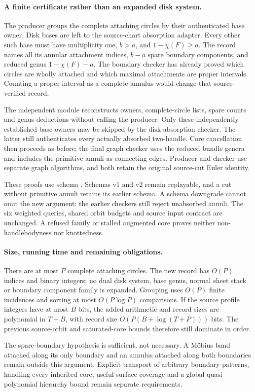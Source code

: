 \paragraph{A finite certificate rather than an expanded disk system.}
The producer groups the complete attaching circles by their authenticated
base owner. Disk bases are left to the source-chart absorption adapter.
Every other such base must have multiplicity one, $b>a$, and
$1-\chi(F)\ge a$. The record names all its annular attachment indices,
$b-a$ spare boundary components, and reduced genus $1-\chi(F)-a$.
The boundary checker has already proved which circles are wholly attached
and which maximal attachments are proper intervals. Counting a proper
interval as a complete annulus would change that source-verified record.

The independent module  reconstructs
owners, complete-circle lists, spare counts and genus deductions without
calling the producer. Only these independently established base owners may
be skipped by the disk-absorption checker. The latter still authenticates
every actually absorbed two-handle. Core cancellation then proceeds as
before; the final graph checker uses the reduced bundle genera and includes
the primitive annuli as connecting edges. Producer and checker use separate
graph algorithms, and both retain the original source-cut Euler identity.

These proofs use schema . Schemas v1 and v2
remain replayable, and a cut without primitive annuli retains its earlier
schema. A schema downgrade cannot omit the new argument: the earlier
checkers still reject unabsorbed annuli. The six weighted queries, shared
orbit budgets and source input contract are unchanged. A refused family or
stalled augmented core proves neither non-handlebodyness nor knottedness.

\paragraph{Size, running time and remaining obligations.}
There are at most $P$ complete attaching circles. The new record has $O(P)$
indices and binary integers; no dual disk system, base genus, normal sheet
stack or boundary component family is expanded. Grouping uses $O(P)$ finite
incidences and sorting at most $O(P\log P)$ comparisons. If the source profile
integers have at most $B$ bits, the added arithmetic and record sizes are
polynomial in $T+B$, with record size $O(P(B+\log(T+P)))$ bits. The previous
source-orbit and saturated-core bounds therefore still dominate in order.

The spare-boundary hypothesis is sufficient, not necessary. A M\"obius band
attached along its only boundary and an annulus attached along both boundaries
remain outside this argument. Explicit transport of arbitrary boundary
patterns, handling every inherited core, useful-surface coverage and a global
quasi-polynomial hierarchy bound remain separate requirements.


